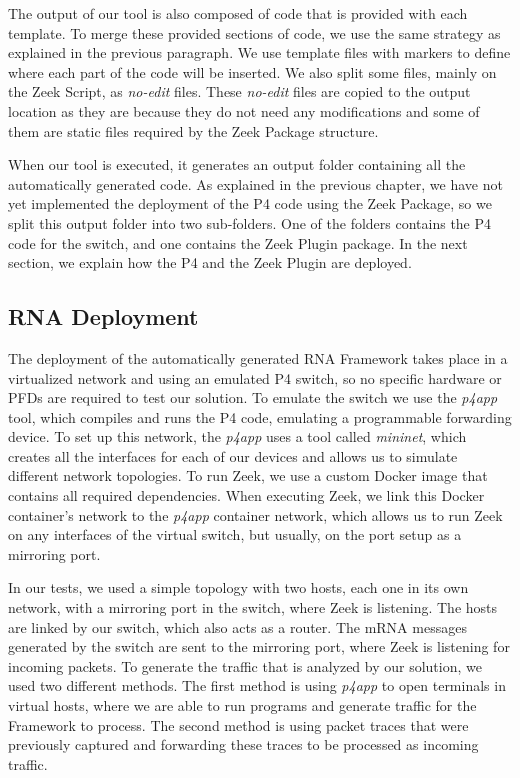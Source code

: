 The output of our tool is also composed of code that is provided with each template. To merge these provided sections of code, we use the same strategy as explained in the previous paragraph. We use template files with markers to define where each part of the code will be inserted. We also split some files, mainly on the Zeek Script, as \textit{no-edit} files. These \textit{no-edit} files are copied to the output location as they are because they do not need any modifications and some of them are static files required by the Zeek Package structure.

When our tool is executed, it generates an output folder containing all the automatically generated code. As explained in the previous chapter, we have not yet implemented the deployment of the P4 code using the Zeek Package, so we split this output folder into two sub-folders. One of the folders contains the P4 code for the switch, and one contains the Zeek Plugin package. In the next section, we explain how the P4 and the Zeek Plugin are deployed.

\subsection{RNA Deployment}
\label{sec:evaluation:deployment}

The deployment of the automatically generated RNA Framework takes place in a virtualized network and using an emulated P4 switch, so no specific hardware or PFDs are required to test our solution. To emulate the switch we use the \textit{p4app} tool, which compiles and runs the P4 code, emulating a programmable forwarding device. To set up this network, the \textit{p4app} uses a tool called \textit{mininet}, which creates all the interfaces for each of our devices and allows us to simulate different network topologies. To run Zeek, we use a custom Docker image that contains all required dependencies. When executing Zeek, we link this Docker container's network to the \textit{p4app} container network, which allows us to run Zeek on any interfaces of the virtual switch, but usually, on the port setup as a mirroring port.

In our tests, we used a simple topology with two hosts, each one in its own network, with a mirroring port in the switch, where Zeek is listening. The hosts are linked by our switch, which also acts as a router. The mRNA messages generated by the switch are sent to the mirroring port, where Zeek is listening for incoming packets. To generate the traffic that is analyzed by our solution, we used two different methods. The first method is using \textit{p4app} to open terminals in virtual hosts, where we are able to run programs and generate traffic for the Framework to process. The second method is using packet traces that were previously captured and forwarding these traces to be processed as incoming traffic.

